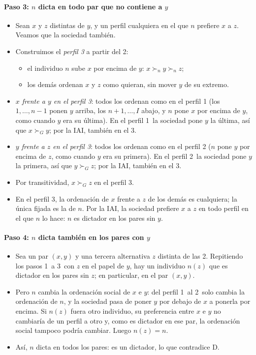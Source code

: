 \documentclass[11pt]{article}
\begin{document}
\paragraph{Paso 3: $n$ dicta en todo par que no contiene a $y$}

\begin{itemize}
\item Sean $x$ y $z$ distintas de $y$, y un perfil cualquiera en el que $n$ prefiere $x$ a $z$. Veamos que la sociedad también.
\item Construimos el \emph{perfil 3} a partir del 2:
  \begin{itemize}
  \item el individuo $n$ sube $x$ por encima de $y$: $x\succ_ny\succ_nz$;
  \item los demás ordenan $x$ y $z$ como quieran, sin mover $y$ de su extremo.
  \end{itemize}
\item \emph{$x$ frente a $y$ en el perfil 3}: todos los ordenan como en el perfil 1 (los $1,\dots,n-1$ ponen $y$ arriba, los $n+1,\dots,I$ abajo, y $n$ pone $x$ por encima de $y$, como cuando $y$ era su última). En el perfil 1~la sociedad pone $y$ la última, así que $x\succ_Gy$; por la IAI, también en el 3.
\item \emph{$y$ frente a $z$ en el perfil 3}: todos los ordenan como en el perfil 2 ($n$ pone $y$ por encima de $z$, como cuando $y$ era su primera). En el perfil 2~la sociedad pone $y$ la primera, así que $y\succ_Gz$; por la IAI, también en el 3.
\item Por transitividad, $x\succ_Gz$ en el perfil 3.
\item En el perfil 3, la ordenación de $x$ frente a $z$ de los demás es cualquiera; la única fijada es la de $n$. Por la IAI, la sociedad prefiere $x$ a $z$ en todo perfil en el que $n$ lo hace: $n$ es dictador en los pares sin $y$.\findemo
\end{itemize}

\paragraph{Paso 4: $n$ dicta también en los pares con $y$}

\begin{itemize}
\item Sea un par $(x,y)$ y una tercera alternativa $z$ distinta de las 2. Repitiendo los pasos 1~a 3~con $z$ en el papel de $y$, hay un individuo $n(z)$ que es dictador en los pares sin $z$; en particular, en el par $(x,y)$.
\item Pero $n$ cambia la ordenación social de $x$ e $y$: del perfil 1~al 2~solo cambia la ordenación de $n$, y la sociedad pasa de poner $y$ por debajo de $x$ a ponerla por encima. Si $n(z)$ fuera otro individuo, su preferencia entre $x$ e $y$ no cambiaría de un perfil a otro y, como es dictador en ese par, la ordenación social tampoco podría cambiar. Luego $n(z)=n$.
\item Así, $n$ dicta en todos los pares: es un dictador, lo que contradice D.\findemo
\end{itemize}
\end{document}
